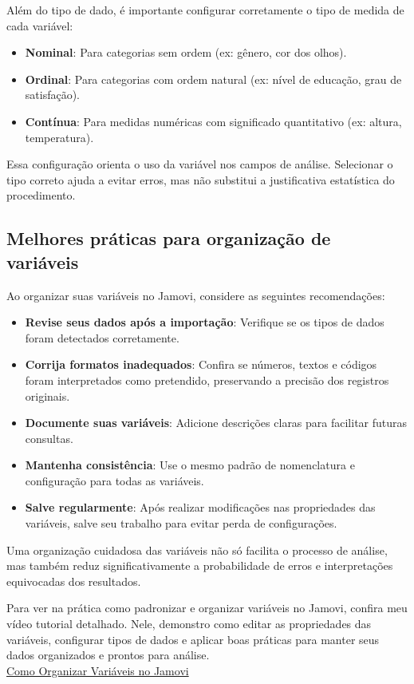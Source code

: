 Além do tipo de dado, é importante configurar corretamente o tipo de medida de cada variável:

\begin{itemize}
    \item \textbf{Nominal}: Para categorias sem ordem (ex: gênero, cor dos olhos).
    \item \textbf{Ordinal}: Para categorias com ordem natural (ex: nível de educação, grau de satisfação).
    \item \textbf{Contínua}: Para medidas numéricas com significado quantitativo (ex: altura, temperatura).
\end{itemize}

Essa configuração orienta o uso da variável nos campos de análise. Selecionar o tipo correto ajuda a evitar erros, mas não substitui a justificativa estatística do procedimento.

\subsection{Melhores práticas para organização de variáveis}

Ao organizar suas variáveis no Jamovi, considere as seguintes recomendações:

\begin{itemize}
    \item \textbf{Revise seus dados após a importação}: Verifique se os tipos de dados foram detectados corretamente.
    \item \textbf{Corrija formatos inadequados}: Confira se números, textos e códigos foram interpretados como pretendido, preservando a precisão dos registros originais.
    \item \textbf{Documente suas variáveis}: Adicione descrições claras para facilitar futuras consultas.
    \item \textbf{Mantenha consistência}: Use o mesmo padrão de nomenclatura e configuração para todas as variáveis.
    \item \textbf{Salve regularmente}: Após realizar modificações nas propriedades das variáveis, salve seu trabalho para evitar perda de configurações.
\end{itemize}

Uma organização cuidadosa das variáveis não só facilita o processo de análise, mas também reduz significativamente a probabilidade de erros e interpretações equivocadas dos resultados.

\begin{tcolorbox}[colback=white,colframe=red,title={\faPlayCircle \ Dica de Conteúdo}]
  Para ver na prática como padronizar e organizar variáveis no Jamovi, confira meu vídeo tutorial detalhado. Nele, demonstro como editar as propriedades das variáveis, configurar tipos de dados e aplicar boas práticas para manter seus dados organizados e prontos para análise.\\
  \textcolor{red}{\faYoutube} \href{https://youtu.be/PJkwPRLT_Q4?si=Ks8_3O7Ok5f-c6Bn}{Como Organizar Variáveis no Jamovi}
\end{tcolorbox}

